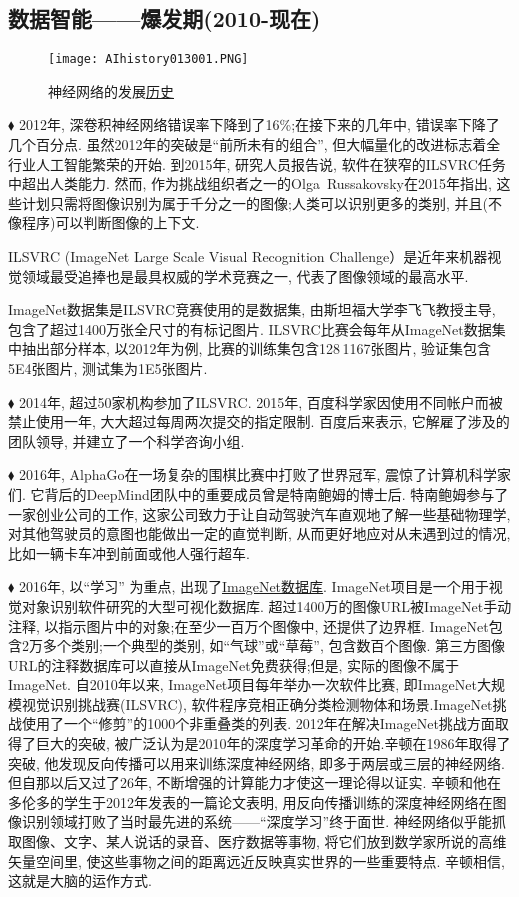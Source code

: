 \subsection{数据智能——爆发期(2010-现在)}
\begin{figure}[H]
\centering
\texttt{[image: AIhistory013001.PNG]}
\caption{神经网络的发展\href{https://aistudio.baidu.com/}{历史}}
\label{AIhistory01300}
\end{figure}
$\blacklozenge$ 2012年, 深卷积神经网络错误率下降到了16\%;在接下来的几年中, 错误率下降了几个百分点. 虽然2012年的突破是“前所未有的组合”, 但大幅量化的改进标志着全行业人工智能繁荣的开始. 到2015年, 研究人员报告说, 软件在狭窄的ILSVRC任务中超出人类能力. 然而, 作为挑战组织者之一的Olga\, Russakovsky在2015年指出, 这些计划只需将图像识别为属于千分之一的图像;人类可以识别更多的类别, 并且(不像程序)可以判断图像的上下文.
\begin{remark}
ILSVRC (ImageNet Large Scale Visual Recognition Challenge）是近年来机器视觉领域最受追捧也是最具权威的学术竞赛之一, 代表了图像领域的最高水平.

ImageNet数据集是ILSVRC竞赛使用的是数据集, 由斯坦福大学李飞飞教授主导, 包含了超过1400万张全尺寸的有标记图片. ILSVRC比赛会每年从ImageNet数据集中抽出部分样本, 以2012年为例, 比赛的训练集包含128\,1167张图片, 验证集包含5E4张图片, 测试集为1E5张图片.

\end{remark}
$\blacklozenge$ 2014年, 超过50家机构参加了ILSVRC. 2015年, 百度科学家因使用不同帐户而被禁止使用一年, 大大超过每周两次提交的指定限制. 百度后来表示, 它解雇了涉及的团队领导, 并建立了一个科学咨询小组.

$\blacklozenge$ 2016年, AlphaGo在一场复杂的围棋比赛中打败了世界冠军, 震惊了计算机科学家们. 它背后的DeepMind团队中的重要成员曾是特南鲍姆的博士后. 特南鲍姆参与了一家创业公司的工作, 这家公司致力于让自动驾驶汽车直观地了解一些基础物理学, 对其他驾驶员的意图也能做出一定的直觉判断, 从而更好地应对从未遇到过的情况, 比如一辆卡车冲到前面或他人强行超车.

$\blacklozenge$ 2016年,  以“学习” 为重点, 出现了\href{http://www.image-net.org/}{ImageNet数据库}. ImageNet项目是一个用于视觉对象识别软件研究的大型可视化数据库. 超过1400万的图像URL被ImageNet手动注释, 以指示图片中的对象;在至少一百万个图像中, 还提供了边界框. ImageNet包含2万多个类别;一个典型的类别, 如“气球”或“草莓”, 包含数百个图像. 第三方图像URL的注释数据库可以直接从ImageNet免费获得;但是, 实际的图像不属于ImageNet. 自2010年以来, ImageNet项目每年举办一次软件比赛, 即ImageNet大规模视觉识别挑战赛(ILSVRC), 软件程序竞相正确分类检测物体和场景.ImageNet挑战使用了一个“修剪”的1000个非重叠类的列表. 2012年在解决ImageNet挑战方面取得了巨大的突破, 被广泛认为是2010年的深度学习革命的开始.辛顿在1986年取得了突破, 他发现反向传播可以用来训练深度神经网络, 即多于两层或三层的神经网络. 但自那以后又过了26年, 不断增强的计算能力才使这一理论得以证实. 辛顿和他在多伦多的学生于2012年发表的一篇论文表明, 用反向传播训练的深度神经网络在图像识别领域打败了当时最先进的系统——“深度学习”终于面世.  神经网络似乎能抓取图像、文字、某人说话的录音、医疗数据等事物, 将它们放到数学家所说的高维矢量空间里, 使这些事物之间的距离远近反映真实世界的一些重要特点. 辛顿相信, 这就是大脑的运作方式.

